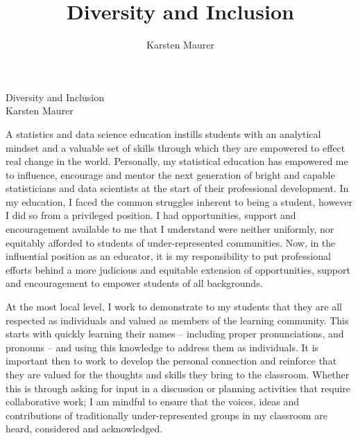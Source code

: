 \documentclass[letterpaper,12pt]{article}\usepackage[]{graphicx}\usepackage[]{color}
\title{Diversity and Inclusion}
\author{Karsten Maurer}
\date{}
\begin{document}
\onehalfspacing

\begin{center}
\Large Diversity and Inclusion \\
\normalsize Karsten Maurer \\
\end{center}

\vspace{.1in}

A statistics and data science education instills students with an analytical mindset and a valuable set of skills through which they are empowered to effect real change in the world. Personally, my statistical education has empowered me to influence, encourage and mentor the next generation of bright and capable statisticians and data scientists at the start of their professional development. In my education, I faced the common struggles inherent to being a student, however I did so from a privileged position. I had opportunities, support and encouragement available to me that I understand were neither uniformly, nor equitably afforded to students of under-represented communities. Now, in the influential position as an educator, it is my responsibility to put professional efforts behind a more judicious and equitable extension of opportunities, support and encouragement to empower students of all backgrounds. 

At the most local level, I work to demonstrate to my students that they are all respected as individuals and valued as members of the learning community. This starts with quickly learning their names -- including proper pronunciations, and pronouns -- and using this knowledge to address them as individuals. It is important then to work to develop the personal connection and reinforce that they are valued for the thoughts and skills they bring to the classroom. Whether this is through asking for input in a discussion or planning activities that require collaborative work; I am mindful to ensure that the voices, ideas and contributions of traditionally under-represented groups in my classroom are heard, considered and acknowledged. 
\end{document}
